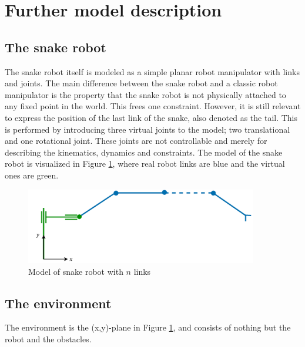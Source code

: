 \section{Further model description}

\subsection{The snake robot}
The snake robot itself is modeled as a simple planar robot manipulator with links and joints. The main difference between the snake robot and a classic robot manipulator is the property that the snake robot is not physically attached to any fixed point in the world. This frees one constraint. However, it is still relevant to express the position of the last link of the snake, also denoted as the tail. This is performed by introducing three virtual joints to the model; two translational and one rotational joint. These joints are not controllable and merely for describing the kinematics, dynamics and constraints. The model of the snake robot is visualized in Figure \ref{fig:2_kin}, where real robot links are blue and the virtual ones are green.

\begin{figure}
    \centering
    \includegraphics[width=0.9\textwidth]{figures/modelspecs/superbasicsnake.pdf}
    \caption{Model of snake robot with $n$ links}
    \label{fig:2_kin}
\end{figure}


\subsection{The environment}
The environment is the (x,y)-plane in Figure \ref{fig:2_kin}, and consists of nothing but the robot and the obstacles.



